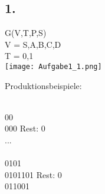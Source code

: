 \documentclass[11pt]{article}
\theoremstyle{definition}
\theoremstyle{remark}
\begin{document}
    \subsection*{1.}
    \begin{normalsize}
        G(V,T,P,S)\\
        V = {S,A,B,C,D}\\
        T = {0,1}\\

        \texttt{[image: Aufgabe1\_1.png]}

        \noindent
        Produktionsbeispiele:\\
        \begin{multicols}{2}

            \\
            00\\
            000 \hspace{15mm} Rest: 0\\
            ... \\

            \\
            0101 \\
            0101101  \hspace{10mm} Rest: 0\\
            011001 \\


\end{multicols}
\end{normalsize}
\end{document}
